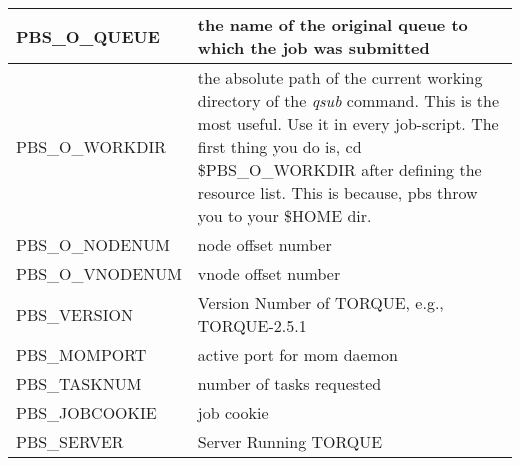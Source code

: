\begin{tabular}{|p{}|p{}|}
PBS\_O\_QUEUE    & the name of the original queue to which the job was submitted \\ \hline
PBS\_O\_WORKDIR  & the absolute path of the current working directory of the \emph{qsub} command. This is the most useful. Use it in every job-script. The first thing you do is, cd \$PBS\_O\_WORKDIR after defining the resource list. This is because, pbs throw you to your \$HOME dir. \\ \hline
PBS\_O\_NODENUM  & node offset number \\ \hline
PBS\_O\_VNODENUM & vnode offset number \\ \hline
PBS\_VERSION     & Version Number of TORQUE, e.g., TORQUE-2.5.1 \\ \hline
PBS\_MOMPORT     & active port for mom daemon \\ \hline
PBS\_TASKNUM     & number of tasks requested \\ \hline
PBS\_JOBCOOKIE   & job cookie \\ \hline
PBS\_SERVER      & Server Running TORQUE \\ \hline
\end{tabular}

